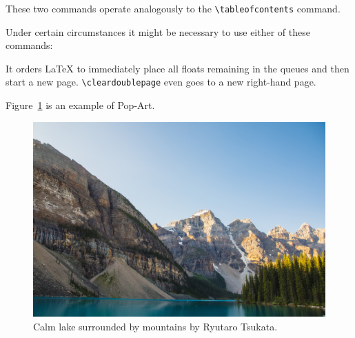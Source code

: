 \documentclass[a4paper]{article}
\begin{document}
\rule{0pt}{2ex}


\rule{0pt}{2ex}

These two commands operate analogously to the \verb|\tableofcontents| command.

\rule{0pt}{2ex}

Under certain circumstances it might be necessary to use either of these commands:

\rule{0pt}{2ex}


\rule{0pt}{2ex}

It orders \LaTeX{} to immediately place all floats remaining in the queues and then start a new page. \texttt{\textbackslash{}cleardoublepage} even goes to a new right-hand page.

\newpage
Figure~\ref{white} is an example of Pop-Art.
\begin{figure}[!hbtp]
\includegraphics[width=\textwidth]{img/mountain.jpg}
\caption[Calm lake surrounded by mountains]{Calm lake surrounded by mountains by Ryutaro Tsukata.\label{white}}
\end{figure}

\newpage
{}
\listoftables

\newpage
\listoffigures \label{tab:lsoffigs}
\end{document}
